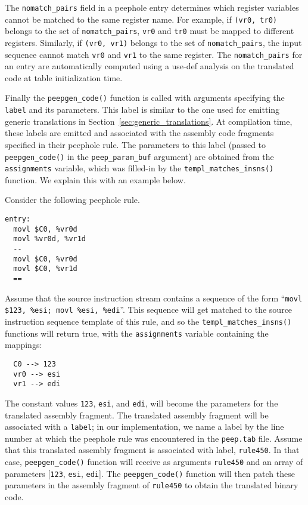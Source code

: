 \documentclass[9pt]{article}
\begin{document}
The {\tt nomatch\_pairs} field in a peephole entry determines which register
variables cannot be matched to the same register name. For example, if
{\tt (vr0, tr0)} belongs to the set of {\tt nomatch\_pairs}, {\tt vr0}
and {\tt tr0} must be mapped to different registers. Similarly,
if {\tt (vr0, vr1)} belongs to the set of {\tt nomatch\_pairs}, the
input sequence cannot match {\tt vr0} and {\tt vr1} to the same register.
The {\tt nomatch\_pairs} for an entry are automatically computed using
a use-def analysis on the translated code at table initialization time.

Finally the {\tt peepgen\_code()} function is called with arguments
specifying the {\tt label} and its parameters. This label is similar to
the one used for emitting generic translations in
Section~\ref{sec:generic_translations}. At compilation time,
these labels are emitted and associated with the assembly code fragments
specified in their peephole rule. The parameters to this label (passed
to {\tt peepgen\_code()} in the {\tt peep\_param\_buf} argument) are
obtained from the {\tt assignments} variable, which was filled-in by
the {\tt templ\_matches\_insns()} function. We explain this with an example
below.

Consider the following peephole rule.
\begin{verbatim}
entry:
  movl $C0, %vr0d
  movl %vr0d, %vr1d
  --
  movl $C0, %vr0d
  movl $C0, %vr1d
  ==
\end{verbatim}
Assume that the source instruction stream contains a sequence
of the form ``{\tt movl \$123, \%esi; movl \%esi, \%edi}''. This
sequence will get matched to the source instruction sequence template
of this rule, and so the {\tt templ\_matches\_insns()} functions
will return true, with the {\tt assignments} variable containing the
mappings:
\begin{verbatim}
  C0 --> 123
  vr0 --> esi
  vr1 --> edi
\end{verbatim}
The constant values {\tt 123}, {\tt esi}, and {\tt edi}, will become the
parameters for the translated assembly fragment. The translated assembly
fragment will be associated with a {\tt label}; in our implementation, we
name a label by the line number at which the peephole rule was encountered
in the {\tt peep.tab} file. Assume that this translated assembly fragment
is associated with label, {\tt rule450}. In that case, {\tt peepgen\_code()}
function will receive as arguments {\tt rule450} and an array of parameters
[{\tt 123}, {\tt esi}, {\tt edi}]. The {\tt peepgen\_code()} function will
then patch these parameters in the assembly fragment of {\tt rule450} to
obtain the translated binary code.
\end{document}
